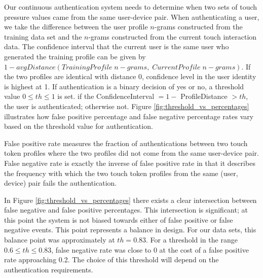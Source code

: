 \documentclass{acm_proc_article-sp}
\begin{document}
Our continuous authentication system needs to determine 
when two sets of touch pressure values came from the same user-device pair. 
When authenticating a user, we take the difference between
the user profile $n$-grams constructed from the training data set 
and the $n$-grams constructed from the current touch interaction data.
The confidence interval that the current user is the same 
user who generated the training profile can be given by 
$1 - avgDistance(TrainingProfile \; n-grams, \; CurrentProfile \; n-grams)$. 
If the two profiles are identical with distance 0, 
confidence level in the user identity is highest at 1.
%
If authentication is a binary decision of yes or no, a threshold value $0 \leq th \leq 1$ is set.
if the ConfidenceInterval $= 1 -$ ProfileDistance $> th$, the user is authenticated; otherwise not. 
Figure \ref{fig:threshold_vs_percentages} illustrates how false positive percentage and false negative percentage rates vary based on the threshold value for authentication. 



False positive rate measures the fraction of authentications between two touch token profiles where 
the two profiles did not come from the same user-device pair.
False negative rate is exactly the inverse of false positive rate in that it describes the
frequency with which the two touch token profiles from the same (user, device) pair fails the authentication. 

In Figure \ref{fig:threshold_vs_percentages} there exists a clear intersection between false negative and false positive percentages. This intersection is significant; at this point the system is not biased towards
either of false positive or false negative events. This point represents a balance in design. For our
data sets, this balance point was approximately at $th=0.83$. For a threshold in the range
$0.6 \leq th \leq 0.83$, false negative rate was close to 0 at the cost of a false positive rate approaching 0.2.
The choice of this threshold will depend on the authentication requirements.
\end{document}
